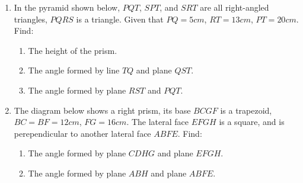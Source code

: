 \documentclass{report}
\begin{document}
\begin{multicols}{2}
\begin{enumerate}
\begin{center}
\begin{tikzpicture}[scale=1.1]
                  \end{tikzpicture}
              \end{center}
        \item In the pyramid shown below, $PQT$, $SPT$, and $SRT$ are all right-angled
              triangles, $PQRS$ is a triangle. Given that $PQ = 5cm$, $RT = 13cm$, $PT =
                  20cm$. Find:
              \begin{enumerate}
                  \item The height of the prism.
                  \item The angle formed by line $TQ$ and plane $QST$.
                  \item The angle formed by plane $RST$ and $PQT$.
              \end{enumerate}
              \begin{center}
              \end{center}
        \item The diagram below shows a right prism, its base $BCGF$ is a trapezoid, $BC = BF
                  = 12cm$, $FG = 16cm$. The lateral face $EFGH$ is a square, and is
              perependicular to another lateral face $ABFE$. Find:
              \begin{enumerate}
                  \item The angle formed by plane $CDHG$ and plane $EFGH$.
                  \item The angle formed by plane $ABH$ and plane $ABFE$.
              \end{enumerate}

\end{enumerate}
\end{multicols}
\end{document}
